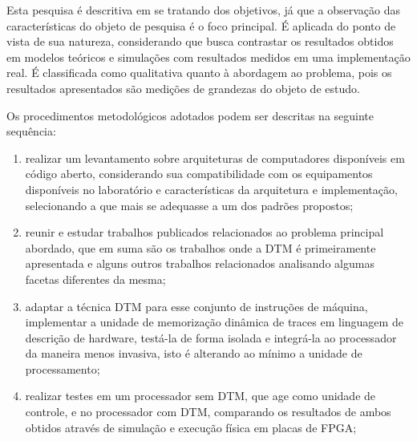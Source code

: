 \label{Metodologia}



Esta pesquisa é descritiva em se tratando dos objetivos, já que a observação das características do objeto de pesquisa é o foco principal. É aplicada do ponto de vista de sua natureza, considerando que busca contrastar os resultados obtidos em modelos teóricos e simulações com resultados medidos em uma implementação real. É classificada como qualitativa quanto à abordagem ao problema, pois os resultados apresentados são medições de grandezas do objeto de estudo.

Os procedimentos metodológicos adotados podem ser descritas na seguinte sequência:

\begin{enumerate}

\item realizar um levantamento sobre arquiteturas de computadores disponíveis em código aberto, considerando sua compatibilidade com os equipamentos disponíveis no laboratório e características da arquitetura e implementação, selecionando a que mais se adequasse a um dos padrões propostos;


\item reunir e estudar trabalhos publicados relacionados ao problema principal abordado, que em suma são os trabalhos onde a DTM é primeiramente apresentada e alguns outros trabalhos relacionados analisando algumas facetas diferentes da mesma;


\item adaptar a técnica DTM para esse conjunto de instruções de máquina, implementar a unidade de memorização dinâmica de traces em linguagem de descrição de hardware, testá-la de forma isolada e integrá-la ao processador da maneira menos invasiva, isto é alterando ao mínimo a unidade de processamento; 

\item realizar testes em um processador sem DTM, que age como unidade de controle, e no processador com DTM, comparando os resultados de ambos obtidos através de  simulação e execução física em placas de FPGA;

\end{enumerate}

